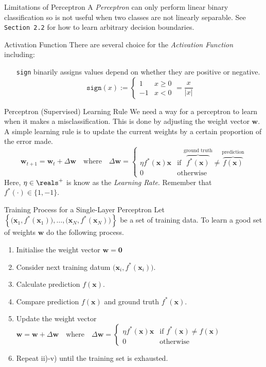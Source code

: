 \documentclass[11pt,a4paper]{article}
\begin{document}
\begin{remark}{Limitations of Perceptron}
  A \textit{Perceptron} can only perform linear binary classification so is not useful when two classes are not linearly separable. See \texttt{Section 2.2} for how to learn arbitrary decision boundaries.
\end{remark}

\begin{proposition}{Activation Function}
  There are several choice for the \textit{Activation Function} including:
  \begin{itemize}
    \item[\texttt{sign}] binarily assigns values depend on whether they are positive or negative.
    \[ \mathtt{sign}(x):=\begin{cases}1&x\geq0\\-1&x<0\end{cases}=\frac{x}{|x|} \]
  \end{itemize}
\end{proposition}

\begin{proposition}{Perceptron (Supervised) Learning Rule}
  We need a way for a perceptron to learn when it makes a misclassification. This is done by adjusting the weight vector $\pmb{w}$. A simple learning rule is to update the current weights by a certain proportion of the error made.
  \[ \pmb{w}_{t+1}=\pmb{w}_t+\Delta\pmb{w}\quad\text{where}\quad\Delta\pmb{w}=\begin{cases}\eta f^*(\pmb{x})\pmb{x}&\text{if }\overbrace{f^*(\pmb{x})}^\text{ground truth}\neq \overbrace{f(\pmb{x})}^\text{prediction}\\0&\text{otherwise}\end{cases}\]
  Here, $\eta\in\reals^+$ is know as the \textit{Learning Rate}. Remember that $f^*(\cdot)\in\{1,-1\}$.
\end{proposition}

\begin{proposition}{Training Process for a Single-Layer Perceptron}
  Let $\left\{\big(\pmb{x}_1,f^*(\pmb{x}_1)\big),\dots,\big(\pmb{x}_N,f^*(\pmb{x}_N)\big)\right\}$ be a set of training data. To learn a good set of weights $\pmb{w}$ do the following process.
  \begin{enumerate}
    \item Initialise the weight vector $\pmb{w}=\pmb0$
    \item Consider next training datum $\big(\pmb{x}_i,f^*(\pmb{x}_i)\big)$.
    \item Calculate prediction $f(\pmb{x})$.
    \item Compare prediction $f(\pmb{x})$ and ground truth $f^*(\pmb{x})$.
    \item Update the weight vector $\pmb{w}=\pmb{w}+\Delta\pmb{w}\quad\text{where}\quad\Delta\pmb{w}=\begin{cases}\eta f^*(\pmb{x})\pmb{x}&\text{if }f^*(\pmb{x})\neq f(\pmb{x})\\0&\text{otherwise}\end{cases}$
    \item Repeat ii)-v) until the training set is exhausted.
  \end{enumerate}
\end{proposition}
\end{document}
